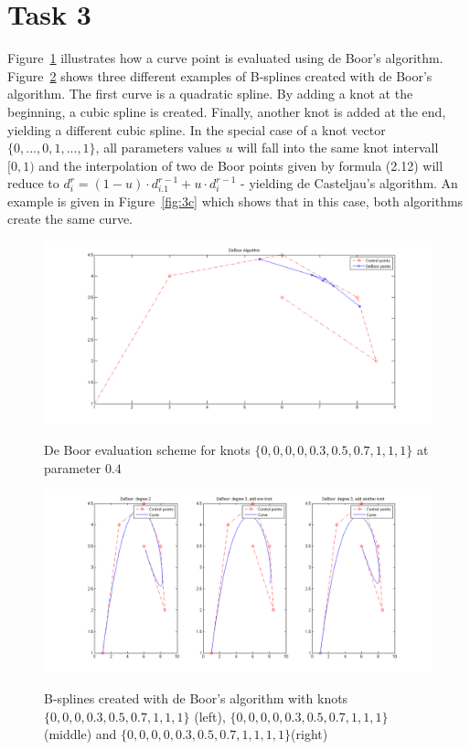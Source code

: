 \documentclass[12pt,a4paper]{article}
\begin{document}
\section{Task 3}
Figure~\ref{fig:3a} illustrates how a curve point is evaluated using de Boor's algorithm. Figure~\ref{fig:3b} shows three different examples of B-splines created with de Boor's algorithm. The first curve is a quadratic spline. By adding a knot at the beginning, a cubic spline is created. Finally, another knot is added at the end, yielding a different cubic spline. In the special case of a knot vector $\{0, ..., 0, 1, ..., 1\}$, all parameters values $u$ will fall into the same knot intervall $[0,1)$ and the interpolation of two de Boor points given by formula (2.12) will reduce to $d_i^r = (1-u)\cdot d_{i.1}^{r-1} + u\cdot d_i^{r-1}$ - yielding de Casteljau's algorithm. An example is given in Figure~\ref{fig:3c} which shows that in this  case, both algorithms create the same curve.

\begin{figure}[hbtp]
\caption{De Boor evaluation scheme for knots $\{0, 0, 0, 0, 0.3, 0.5, 0.7, 1, 1, 1\}$ at parameter $0.4$}
\centering
\includegraphics[width=\textwidth]{DeBoorAlgorithm.png}
\label{fig:3a}
\end{figure}

\begin{figure}[hbtp]
\caption{B-splines created with de Boor's algorithm with knots $\{0, 0, 0, 0.3, 0.5, 0.7, 1, 1, 1\}$ (left), $\{0, 0, 0, 0, 0.3, 0.5, 0.7, 1, 1, 1\}$ (middle) and $\{0, 0, 0, 0, 0.3, 0.5, 0.7, 1, 1, 1, 1\}$(right)}
\centering
\includegraphics[width=\textwidth]{DeBoorCurves.png}
\label{fig:3b}
\end{figure}
\end{document}
